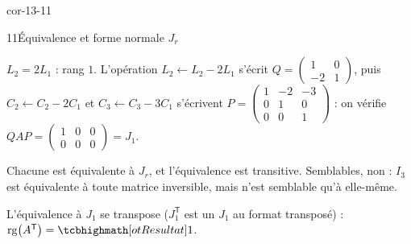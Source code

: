 \begin{blocLivre}{cor-13-11}
\begin{corrige}{11}{Équivalence et forme normale $J_r$}
\begin{questions}
  \item $L_2=2L_1$ : rang $1$. L'opération $L_2\leftarrow L_2-2L_1$
    s'écrit $Q=\begin{pmatrix}1&0\\-2&1\end{pmatrix}$, puis
    $C_2\leftarrow C_2-2C_1$ et $C_3\leftarrow C_3-3C_1$ s'écrivent
    $P=\begin{pmatrix}1&-2&-3\\0&1&0\\0&0&1\end{pmatrix}$ :
    on vérifie $QAP=\begin{pmatrix}1&0&0\\0&0&0\end{pmatrix}=J_1$.
  \item Chacune est équivalente à $J_r$, et l'équivalence est transitive.
    Semblables, non : $I_3$ est équivalente à toute matrice inversible,
    mais n'est semblable qu'à elle-même.
  \item L'équivalence à $J_1$ se transpose
    ($J_1^{\mathsf T}$ est un $J_1$ au format transposé) :
    $\operatorname{rg}\bigl(A^{\mathsf T}\bigr)=\res{1}$.
\end{questions}
\end{corrige}
\end{blocLivre}

